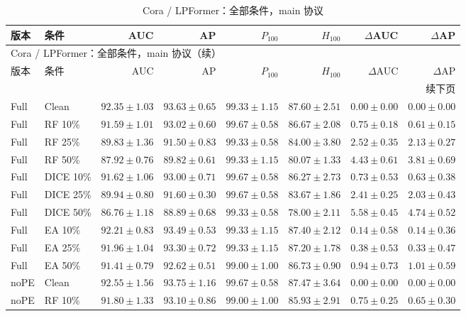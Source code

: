 {\footnotesize
\setlength{\tabcolsep}{3.2pt}
\renewcommand{\arraystretch}{1.10}
\begin{longtable}{llrrrrrr}
\caption{Cora / LPFormer：全部条件，main 协议}\\
\toprule
版本 & 条件 & AUC & AP & $P_{100}$ & $H_{100}$ & $\Delta$AUC & $\Delta$AP \\
\midrule
\endfirsthead
\multicolumn{8}{l}{Cora / LPFormer：全部条件，main 协议（续）}\\
\toprule
版本 & 条件 & AUC & AP & $P_{100}$ & $H_{100}$ & $\Delta$AUC & $\Delta$AP \\
\midrule
\endhead
\midrule\multicolumn{8}{r}{续下页}\\
\endfoot
\bottomrule
\endlastfoot
Full & Clean & $92.35\pm1.03$ & $93.63\pm0.65$ & $99.33\pm1.15$ & $87.60\pm2.51$ & $0.00\pm0.00$ & $0.00\pm0.00$ \\
Full & RF 10\% & $91.59\pm1.01$ & $93.02\pm0.60$ & $99.67\pm0.58$ & $86.67\pm2.08$ & $0.75\pm0.18$ & $0.61\pm0.15$ \\
Full & RF 25\% & $89.83\pm1.36$ & $91.50\pm0.83$ & $99.33\pm0.58$ & $84.00\pm3.80$ & $2.52\pm0.35$ & $2.13\pm0.27$ \\
Full & RF 50\% & $87.92\pm0.76$ & $89.82\pm0.61$ & $99.33\pm1.15$ & $80.07\pm1.33$ & $4.43\pm0.61$ & $3.81\pm0.69$ \\
Full & DICE 10\% & $91.62\pm1.06$ & $93.00\pm0.71$ & $99.67\pm0.58$ & $86.27\pm2.73$ & $0.73\pm0.53$ & $0.63\pm0.38$ \\
Full & DICE 25\% & $89.94\pm0.80$ & $91.60\pm0.30$ & $99.67\pm0.58$ & $83.67\pm1.86$ & $2.41\pm0.25$ & $2.03\pm0.43$ \\
Full & DICE 50\% & $86.76\pm1.18$ & $88.89\pm0.68$ & $99.33\pm0.58$ & $78.00\pm2.11$ & $5.58\pm0.45$ & $4.74\pm0.52$ \\
Full & EA 10\% & $92.21\pm0.83$ & $93.49\pm0.53$ & $99.33\pm1.15$ & $87.40\pm2.12$ & $0.14\pm0.58$ & $0.14\pm0.36$ \\
Full & EA 25\% & $91.96\pm1.04$ & $93.30\pm0.72$ & $99.33\pm1.15$ & $87.20\pm1.78$ & $0.38\pm0.53$ & $0.33\pm0.47$ \\
Full & EA 50\% & $91.41\pm0.79$ & $92.62\pm0.51$ & $99.00\pm1.00$ & $86.73\pm0.90$ & $0.94\pm0.73$ & $1.01\pm0.59$ \\
noPE & Clean & $92.55\pm1.56$ & $93.75\pm1.16$ & $99.67\pm0.58$ & $87.47\pm3.64$ & $0.00\pm0.00$ & $0.00\pm0.00$ \\
noPE & RF 10\% & $91.80\pm1.33$ & $93.10\pm0.86$ & $99.00\pm1.00$ & $85.93\pm2.91$ & $0.75\pm0.25$ & $0.65\pm0.30$ \\

\end{longtable}}
